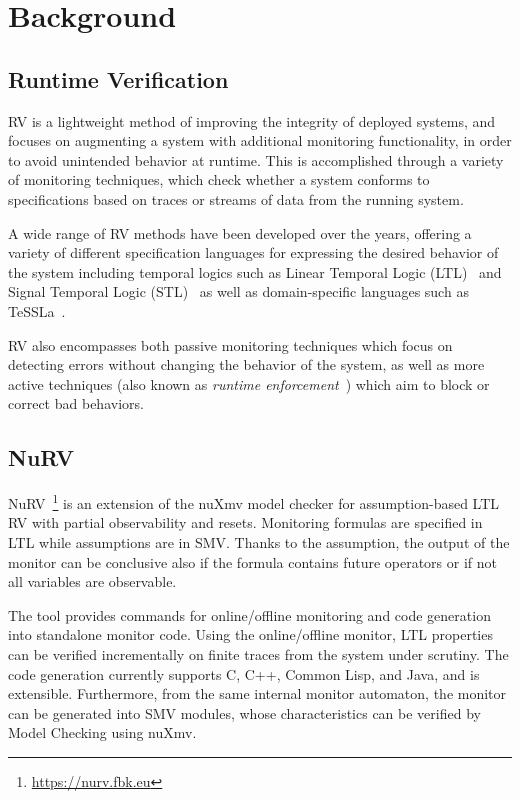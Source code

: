 \section{Background}\label{sec:background}

\subsection{Runtime Verification}
RV is a lightweight method of improving the integrity of deployed systems, and focuses on augmenting a system with additional monitoring functionality, in order to avoid unintended behavior at runtime.
This is accomplished through a variety of monitoring techniques, which check whether a system conforms to specifications based on traces or streams of data from the running system.

A wide range of RV methods have been developed over the years, offering a variety of different specification languages for expressing the desired behavior of the system including temporal logics such as Linear Temporal Logic (LTL)~\cite{pnueli1977ltl} and Signal Temporal Logic (STL)~\cite{donze2013stl} as well as domain-specific languages such as TeSSLa~\cite{convent2018tessla}.

RV also encompasses both passive monitoring techniques which focus on detecting errors without changing the behavior of the system, as well as more active techniques (also known as \emph{runtime enforcement}~\cite{falcone2010runtimeenforcement}) which aim to block or correct bad behaviors.

\subsection{NuRV}

NuRV~\cite{CimattiTT19a}\footnote{\url{https://nurv.fbk.eu}} is an extension of the nuXmv model checker for assumption-based LTL RV with partial observability and resets. Monitoring formulas are specified in LTL while assumptions are in SMV. Thanks to the assumption, the output of the monitor can be conclusive also if the formula contains future operators or if not all variables are observable.

The tool provides commands for online/offline monitoring and code generation into standalone monitor code. Using the online/offline monitor, LTL properties can be verified incrementally on finite traces from the system under scrutiny. The code generation currently supports C, C++, Common Lisp, and Java, and is extensible. Furthermore, from the same internal monitor automaton, the monitor can be generated into SMV modules, whose characteristics can be verified by Model Checking using nuXmv.

